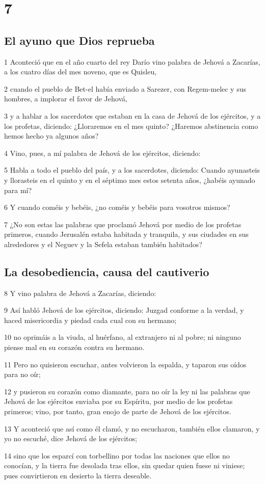 \chapter{7}

\section*{El ayuno que Dios reprueba}

\par 1 Aconteció que en el año cuarto del rey Darío vino palabra de Jehová a Zacarías, a los cuatro días del mes noveno, que es Quisleu,
\par 2 cuando el pueblo de Bet-el había enviado a Sarezer, con Regem-melec y sus hombres, a implorar el favor de Jehová,
\par 3 y a hablar a los sacerdotes que estaban en la casa de Jehová de los ejércitos, y a los profetas, diciendo: ¿Lloraremos en el mes quinto? ¿Haremos abstinencia como hemos hecho ya algunos años?
\par 4 Vino, pues, a mí palabra de Jehová de los ejércitos, diciendo:
\par 5 Habla a todo el pueblo del país, y a los sacerdotes, diciendo: Cuando ayunasteis y llorasteis en el quinto y en el séptimo mes estos setenta años, ¿habéis ayunado para mí?
\par 6 Y cuando coméis y bebéis, ¿no coméis y bebéis para vosotros mismos?
\par 7 ¿No son estas las palabras que proclamó Jehová por medio de los profetas primeros, cuando Jerusalén estaba habitada y tranquila, y sus ciudades en sus alrededores y el Neguev y la Sefela estaban también habitados?

\section*{La desobediencia, causa del cautiverio}

\par 8 Y vino palabra de Jehová a Zacarías, diciendo:
\par 9 Así habló Jehová de los ejércitos, diciendo: Juzgad conforme a la verdad, y haced misericordia y piedad cada cual con su hermano;
\par 10 no oprimáis a la viuda, al huérfano, al extranjero ni al pobre; ni ninguno piense mal en su corazón contra su hermano.
\par 11 Pero no quisieron escuchar, antes volvieron la espalda, y taparon sus oídos para no oír;
\par 12 y pusieron su corazón como diamante, para no oír la ley ni las palabras que Jehová de los ejércitos enviaba por su Espíritu, por medio de los profetas primeros; vino, por tanto, gran enojo de parte de Jehová de los ejércitos. 
\par 13 Y aconteció que así como él clamó, y no escucharon, también ellos clamaron, y yo no escuché, dice Jehová de los ejércitos;
\par 14 sino que los esparcí con torbellino por todas las naciones que ellos no conocían, y la tierra fue desolada tras ellos, sin quedar quien fuese ni viniese; pues convirtieron en desierto la tierra deseable.


